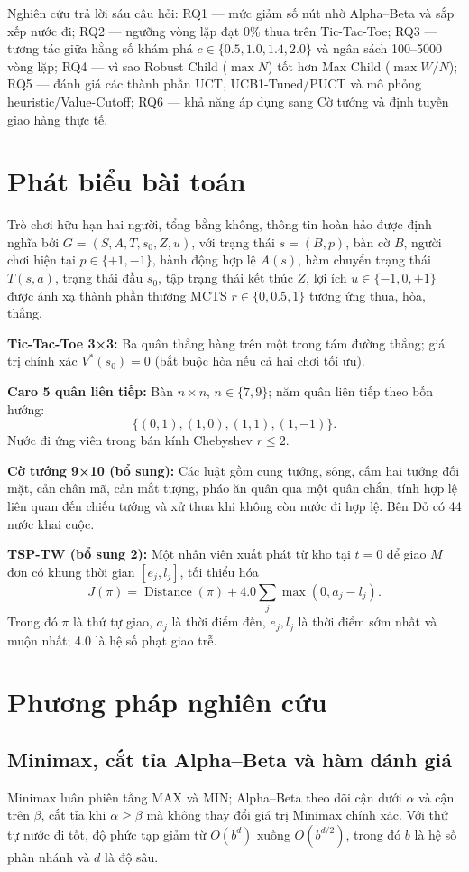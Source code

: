 \documentclass[11pt,a4paper]{article}
\begin{document}
Nghiên cứu trả lời sáu câu hỏi: RQ1 — mức giảm số nút nhờ Alpha–Beta và sắp xếp nước đi; RQ2 — ngưỡng vòng lặp đạt 0\% thua trên Tic-Tac-Toe; RQ3 — tương tác giữa hằng số khám phá $c\in\{0.5,1.0,1.4,2.0\}$ và ngân sách 100–5000 vòng lặp; RQ4 — vì sao Robust Child ($\max N$) tốt hơn Max Child ($\max W/N$); RQ5 — đánh giá các thành phần UCT, UCB1-Tuned/PUCT và mô phỏng heuristic/Value-Cutoff; RQ6 — khả năng áp dụng sang Cờ tướng và định tuyến giao hàng thực tế.
\section{Phát biểu bài toán}
Trò chơi hữu hạn hai người, tổng bằng không, thông tin hoàn hảo được định nghĩa bởi $G=(S,A,T,s_0,Z,u)$, với trạng thái $s=(B,p)$, bàn cờ $B$, người chơi hiện tại $p\in\{+1,-1\}$, hành động hợp lệ $A(s)$, hàm chuyển trạng thái $T(s,a)$, trạng thái đầu $s_0$, tập trạng thái kết thúc $Z$, lợi ích $u\in\{-1,0,+1\}$ được ánh xạ thành phần thưởng MCTS $r\in\{0,0.5,1\}$ tương ứng thua, hòa, thắng.

\textbf{Tic-Tac-Toe 3×3:} Ba quân thẳng hàng trên một trong tám đường thắng; giá trị chính xác $V^*(s_0)=0$ (bắt buộc hòa nếu cả hai chơi tối ưu).

\textbf{Caro 5 quân liên tiếp:} Bàn $n\times n$, $n\in\{7,9\}$; năm quân liên tiếp theo bốn hướng:\[\{(0,1),(1,0),(1,1),(1,-1)\}.\] Nước đi ứng viên trong bán kính Chebyshev $r\le 2$.

\textbf{Cờ tướng 9×10 (bổ sung):} Các luật gồm cung tướng, sông, cấm hai tướng đối mặt, cản chân mã, cản mắt tượng, pháo ăn quân qua một quân chắn, tính hợp lệ liên quan đến chiếu tướng và xử thua khi không còn nước đi hợp lệ. Bên Đỏ có 44 nước khai cuộc.

\textbf{TSP-TW (bổ sung 2):} Một nhân viên xuất phát từ kho tại $t=0$ để giao $M$ đơn có khung thời gian $[e_j,l_j]$, tối thiểu hóa
\[J(\pi)=\operatorname{Distance}(\pi)+4.0\sum_j\max(0,a_j-l_j).\]
Trong đó $\pi$ là thứ tự giao, $a_j$ là thời điểm đến, $e_j,l_j$ là thời điểm sớm nhất và muộn nhất; 4.0 là hệ số phạt giao trễ.
\section{Phương pháp nghiên cứu}
\subsection{Minimax, cắt tỉa Alpha–Beta và hàm đánh giá}
Minimax luân phiên tầng MAX và MIN; Alpha–Beta theo dõi cận dưới $\alpha$ và cận trên $\beta$, cắt tỉa khi $\alpha\ge\beta$ mà không thay đổi giá trị Minimax chính xác. Với thứ tự nước đi tốt, độ phức tạp giảm từ $O(b^d)$ xuống $O(b^{d/2})$, trong đó $b$ là hệ số phân nhánh và $d$ là độ sâu.
\end{document}
